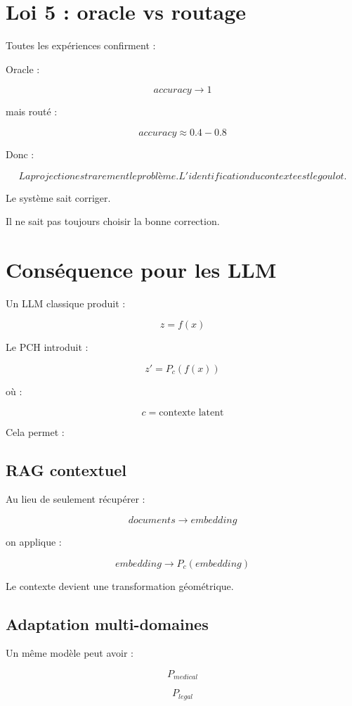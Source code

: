 \documentclass{article}
\begin{document}
\section{Loi 5 : oracle vs routage}

Toutes les expériences confirment :

Oracle :

\[
accuracy\rightarrow1
\]


mais routé :

\[
accuracy\approx0.4-0.8
\]


Donc :

\[
\boxed{
La projection est rarement le problème.
L'identification du contexte est le goulot.
}
\]


Le système sait corriger.

Il ne sait pas toujours choisir la bonne correction.


\section{Conséquence pour les LLM}

Un LLM classique produit :

\[
z=f(x)
\]


Le PCH introduit :

\[
z'=P_c(f(x))
\]


où :

\[
c=\text{contexte latent}
\]


Cela permet :


\subsection{RAG contextuel}

Au lieu de seulement récupérer :

\[
documents\rightarrow embedding
\]


on applique :

\[
embedding\rightarrow P_c(embedding)
\]


Le contexte devient une transformation géométrique.


\subsection{Adaptation multi-domaines}

Un même modèle peut avoir :

\[
P_{medical}
\]

\[
P_{legal}
\]
\end{document}
